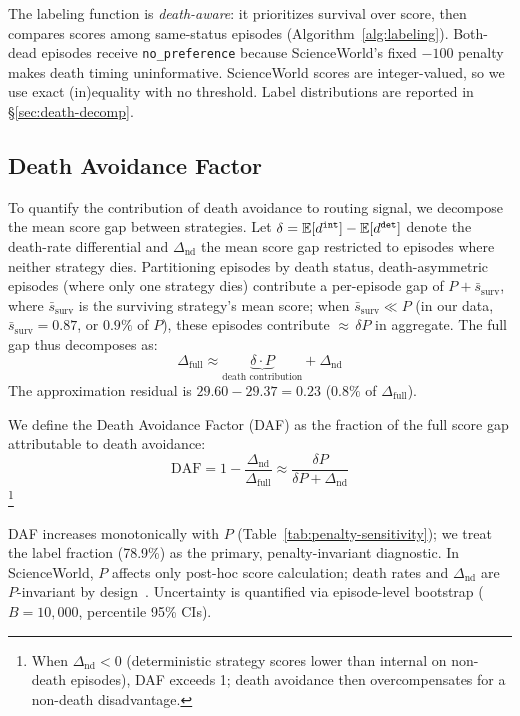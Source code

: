 The labeling function is \emph{death-aware}: it prioritizes survival over score, then compares scores among same-status episodes (Algorithm~\ref{alg:labeling}). Both-dead episodes receive \texttt{no\_preference} because ScienceWorld's fixed $-100$ penalty makes death timing uninformative. ScienceWorld scores are integer-valued, so we use exact (in)equality with no threshold. Label distributions are reported in \S\ref{sec:death-decomp}.

\subsection{Death Avoidance Factor}
\label{sec:daf}

To quantify the contribution of death avoidance to routing signal, we decompose the mean score gap between strategies. Let $\delta = \mathbb{E}[d^{\tt int}] - \mathbb{E}[d^{\tt det}]$ denote the death-rate differential and $\Delta_{\text{nd}}$ the mean score gap restricted to episodes where neither strategy dies. Partitioning episodes by death status, death-asymmetric episodes (where only one strategy dies) contribute a per-episode gap of $P + \bar{s}_{\text{surv}}$, where $\bar{s}_{\text{surv}}$ is the surviving strategy's mean score; when $\bar{s}_{\text{surv}} \ll P$ (in our data, $\bar{s}_{\text{surv}} = 0.87$, or $0.9\%$ of $P$), these episodes contribute ${\approx}\,\delta P$ in aggregate. The full gap thus decomposes as:
\begin{equation}
    \Delta_{\text{full}} \approx \underbrace{\delta \cdot P}_{\text{death contribution}} + \Delta_{\text{nd}}
\end{equation}
The approximation residual is $29.60 - 29.37 = 0.23$ ($0.8\%$ of $\Delta_{\text{full}}$).

We define the Death Avoidance Factor (DAF) as the fraction of the full score gap attributable to death avoidance:
\begin{equation}
    \text{DAF} = 1 - \frac{\Delta_{\text{nd}}}{\Delta_{\text{full}}} \approx \frac{\delta P}{\delta P + \Delta_{\text{nd}}}
\end{equation}%
\footnote{When $\Delta_{\text{nd}} < 0$ (deterministic strategy scores lower than internal on non-death episodes), DAF exceeds 1; death avoidance then overcompensates for a non-death disadvantage.}

DAF increases monotonically with $P$ (Table~\ref{tab:penalty-sensitivity}); we treat the label fraction (78.9\%) as the primary, penalty-invariant diagnostic. In ScienceWorld, $P$ affects only post-hoc score calculation; death rates and $\Delta_{\text{nd}}$ are $P$-invariant by design~\citep{ng1999policy}. Uncertainty is quantified via episode-level bootstrap ($B{=}10{,}000$, percentile 95\% CIs).

